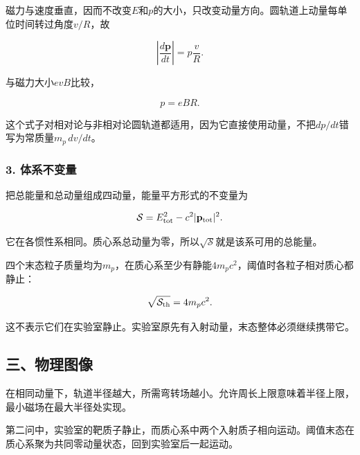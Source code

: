 \documentclass[12pt,a4paper,fontset=fandol]{ctexart}
\begin{document}
磁力与速度垂直，因而不改变\(E\)和\(p\)的大小，只改变动量方向。圆轨道上动量每单位时间转过角度\(v/R\)，故

\[
\left|\frac{d\mathbf p}{dt}\right|
=p\frac vR.
\]

与磁力大小\(evB\)比较，

\[
\boxed{p=eBR}.
\]

这个式子对相对论与非相对论圆轨道都适用，因为它直接使用动量，不把\(dp/dt\)错写为常质量\(m_p\,dv/dt\)。

\subsubsection{3. 体系不变量}\label{ux4f53ux7cfbux4e0dux53d8ux91cf}

把总能量和总动量组成四动量，能量平方形式的不变量为

\[
\mathcal S=E_{\rm tot}^2-c^2|\mathbf p_{\rm tot}|^2.
\]

它在各惯性系相同。质心系总动量为零，所以\(\sqrt{\mathcal S}\)就是该系可用的总能量。

四个末态粒子质量均为\(m_p\)，在质心系至少有静能\(4m_pc^2\)，阈值时各粒子相对质心都静止：

\[
\sqrt{\mathcal S_{\rm th}}=4m_pc^2.
\]

这不表示它们在实验室静止。实验室原先有入射动量，末态整体必须继续携带它。

\subsection{三、物理图像}\label{ux4e09ux7269ux7406ux56feux50cf-3}

在相同动量下，轨道半径越大，所需弯转场越小。允许周长上限意味着半径上限，最小磁场在最大半径处实现。

第二问中，实验室的靶质子静止，而质心系中两个入射质子相向运动。阈值末态在质心系聚为共同零动量状态，回到实验室后一起运动。

\begin{center}
\begin{minipage}{\linewidth}
\centering\begingroup{}
\ifdim\wd\diagrambox>.88\linewidth
\sbox{\diagrambox}{\resizebox{.88\linewidth}{!}{\usebox{\diagrambox}}}\fi
\ifdim\ht\diagrambox>.38\textheight
\resizebox{!}{.38\textheight}{\usebox{\diagrambox}}
\else\usebox{\diagrambox}\fi
\par{}\endgroup\end{minipage}\end{center}
\end{document}
